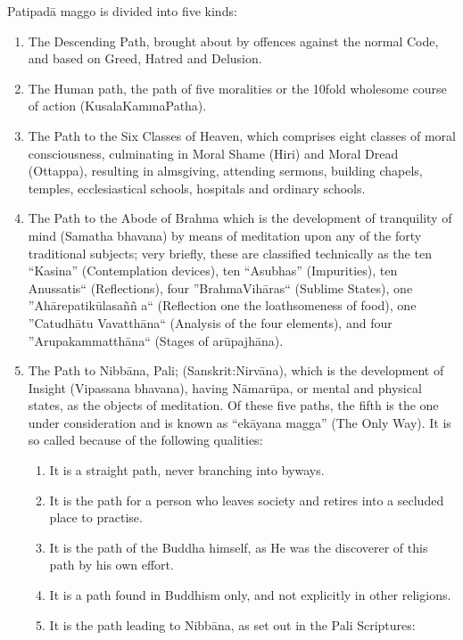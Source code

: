 \documentclass[a5paper,10pt,english]{book}
\begin{document}
\sphinxAtStartPar
Patipadā maggo is divided into five kinds:
\begin{enumerate}
%
\item {} 
\sphinxAtStartPar
The Descending Path, brought about by offences against the normal Code, and based on Greed, Hatred and Delusion.

\item {} 
\sphinxAtStartPar
The Human path, the path of five moralities or the 10\sphinxhyphen{}fold wholesome course of action (Kusala\sphinxhyphen{}Kamma\sphinxhyphen{}Patha).

\item {} 
\sphinxAtStartPar
The Path to the Six Classes of Heaven, which comprises eight classes of moral consciousness, culminating in Moral Shame (Hiri) and Moral Dread (Ottappa), resulting in alms\sphinxhyphen{}giving, attending sermons, building chapels, temples, ecclesiastical schools, hospitals and ordinary schools.

\item {} 
\sphinxAtStartPar
The Path to the Abode of Brahma which is the development of tranquility of mind (Samatha bhavana) by means of meditation upon any of the forty traditional subjects; very briefly, these are classified technically as the ten “Kasina” (Contemplation devices), ten “Asubhas” (Impurities), ten Anussatis“ (Reflections), four ”Brahma\sphinxhyphen{}Vihāras“ (Sublime States), one ”Ahārepatikūlasaññ a“ (Reflection one the loathsomeness of food), one ”Catudhātu Vavatthāna“ (Analysis of the four elements), and four ”Arupakammatthāna“ (Stages of arūpa\sphinxhyphen{}jhāna).

\item {} 
\sphinxAtStartPar
The Path to Nibbāna, Pali; (Sanskrit:Nirvāna), which is the development of Insight (Vipassana bhavana), having Nāmarūpa, or mental and physical states, as the objects of meditation. Of these five paths, the fifth is the one under consideration and is known as “ekāyana magga” (The Only Way). It is so called because of the following qualities:
\begin{enumerate}
%
\item {} 
\sphinxAtStartPar
It is a straight path, never branching into byways.

\item {} 
\sphinxAtStartPar
It is the path for a person who leaves society and retires into a secluded place to practise.

\item {} 
\sphinxAtStartPar
It is the path of the Buddha himself, as He was the discoverer of this path by his own effort.

\item {} 
\sphinxAtStartPar
It is a path found in Buddhism only, and not explicitly in other religions.

\item {} 
\sphinxAtStartPar
It is the path leading to Nibbāna, as set out in the Pali Scriptures:

\end{enumerate}

\end{enumerate}
\end{document}
